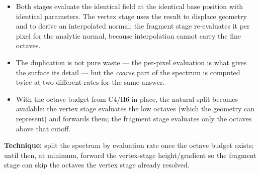 \documentclass[11pt,a4paper]{article}
\begin{document}
\begin{itemize}
    \item Both stages evaluate the identical field at the identical base position with identical parameters. The vertex
    stage uses the result to displace geometry and to derive an interpolated normal; the fragment stage re-evaluates it
    per pixel for the analytic normal, because interpolation cannot carry the fine octaves.
    \item The duplication is not pure waste --- the per-pixel evaluation is what gives the surface its detail --- but the
    \emph{coarse} part of the spectrum is computed twice at two different rates for the same answer.
    \item With the octave budget from C4/H6 in place, the natural split becomes available: the vertex stage evaluates the
    low octaves (which the geometry can represent) and forwards them; the fragment stage evaluates only the octaves above
    that cutoff.
\end{itemize}

\textbf{Technique:} split the spectrum by evaluation rate once the octave budget exists; until then, at minimum, forward
the vertex-stage height/gradient so the fragment stage can skip the octaves the vertex stage already resolved.
\end{document}
